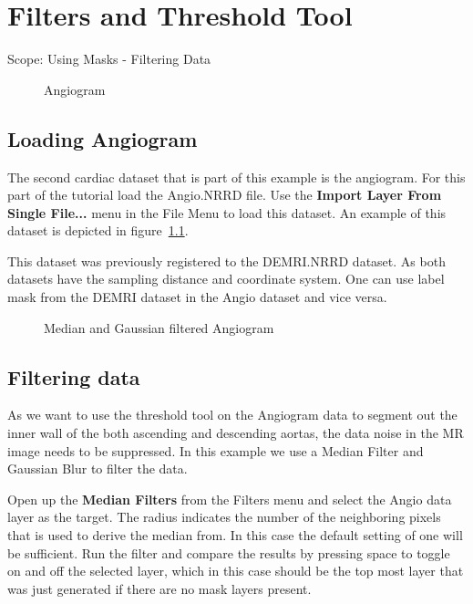 \documentclass[fleqn,11pt,openany]{book}
\begin{document}
\chapter{Filters and Threshold Tool}

\begin{introduction}
Scope: Using Masks - Filtering Data
\end{introduction}

\begin{figure}
\caption{Angiogram}\label{fig:AngioData}
\end{figure}


\section{Loading  Angiogram}

The second cardiac dataset that is part of this example is the angiogram. For this part of the tutorial load the Angio.NRRD file. Use the {\bf Import Layer From Single File...} menu in the File Menu to load this dataset. An example of this dataset is depicted in figure~\ref{fig:AngioData}.

This dataset was previously registered to the DEMRI.NRRD dataset. As both datasets have the sampling distance and coordinate system. One can use label mask from the DEMRI dataset in the Angio dataset and vice versa. 

\begin{figure}
\caption{Median and Gaussian filtered Angiogram}\label{fig:FilteredAngioData}
\end{figure}

\section{Filtering data}

As we want to use the threshold tool on the Angiogram data to segment out the inner wall of the both ascending and descending aortas, the data noise in the MR image needs to be suppressed. In this example we use a Median Filter and Gaussian Blur to filter the data.

Open up the {\bf Median Filters} from the Filters menu and select the Angio data layer as the target. The radius indicates the number of the neighboring pixels that is used to derive the median from. In this case the default setting of one will be sufficient. Run the filter and compare the results by pressing space to toggle on and off the selected layer, which in this case should be the top most layer that was just generated if there are no mask layers present.
\end{document}
